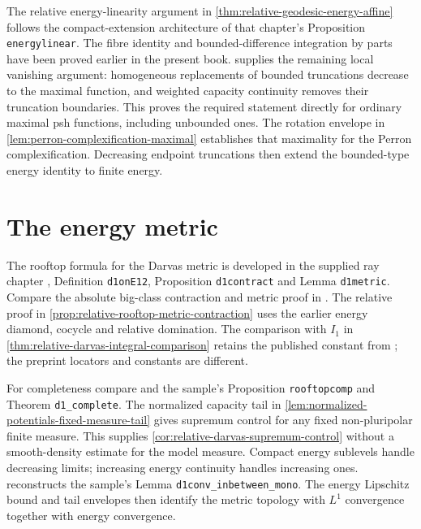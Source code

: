 The relative energy-linearity argument in \cref{thm:relative-geodesic-energy-affine} follows the compact-extension architecture of that chapter's Proposition \texttt{energylinear}. The fibre identity and bounded-difference integration by parts have been proved earlier in the present book.  supplies the remaining local vanishing argument: homogeneous replacements of bounded truncations decrease to the maximal function, and weighted capacity continuity removes their truncation boundaries. This proves the required statement directly for ordinary maximal psh functions, including unbounded ones. The rotation envelope in \cref{lem:perron-complexification-maximal} establishes that maximality for the Perron complexification. Decreasing endpoint truncations then extend the bounded-type energy identity to finite energy.

\section{The energy metric}\label{sec:history-energy-metric}
The rooftop formula for the Darvas metric is developed in the supplied ray chapter \cite{XiaSampleBook}, Definition \texttt{d1onE12}, Proposition \texttt{d1contract} and Lemma \texttt{d1metric}. Compare the absolute big-class contraction and metric proof in \cite[Proposition 3.5 and Theorem 3.6, pp.~3069--3070]{DDNL18big}. The relative proof in \cref{prop:relative-rooftop-metric-contraction} uses the earlier energy diamond, cocycle and relative domination. The comparison with $I_1$ in \cref{thm:relative-darvas-integral-comparison} retains the published constant from \cite[Theorem 3.7 and Lemma 3.8, pp.~3070--3072]{DDNL18big}; the preprint locators and constants are different.

For completeness compare \cite[Lemma 3.9 and Theorem 3.10, pp.~3072--3073]{DDNL18big} and the sample's Proposition \texttt{rooftopcomp} and Theorem \texttt{d1\_complete}. The normalized capacity tail in \cref{lem:normalized-potentials-fixed-measure-tail} gives supremum control for any fixed non-pluripolar finite measure. This supplies \cref{cor:relative-darvas-supremum-control} without a smooth-density estimate for the model measure. Compact energy sublevels handle decreasing limits; increasing energy continuity handles increasing ones.  reconstructs the sample's Lemma \texttt{d1conv\_inbetween\_mono}. The energy Lipschitz bound and tail envelopes then identify the metric topology with $L^1$ convergence together with energy convergence.

